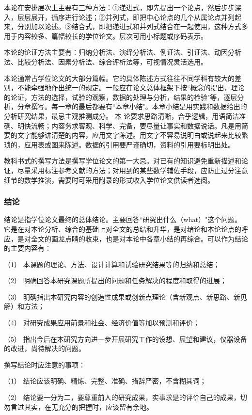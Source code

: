 本论在安排层次上主要有三种方法：①递进式，即先提出一个论点，然后步步深入，层层展开，循序进行论述；②并列式，即把中心论点的几个从属论点并列起来，分别加以论述。③结合式，即把递进式和并列式结合在一起使用，这种方式多用于内容较多、篇幅较长的学位论文。层次可用小标题或序码表示。

本论的论证方法主要有：归纳分析法、演绎分析法、例证法、引证法、动因分析法、比较分析法、因素分析法、综合评析法等，可视情况灵活选用。

本论通常占学位论文的大部分篇幅。它的具体陈述方式往往不同学科有较大的差别，不能牵强地作出统一的规定。一般应在论文总体框架下按``概念的提出，理论的论证，方法的选择，试验的观察，数据的处理与分析，结果的检验"等，逐层分析，分章撰写。每一章的最后都要有``本章小结"。本章小结是用实践和数据给出的分析研究结果，最忌主观推测成分。
本
论要求思路清晰，合乎逻辑，用语简洁准确、明快流畅；内容务求客观、科学、完备，要尽量让事实和数据说话。凡是用简要的文字能够讲清楚的内容，应用文字陈述。用文字不容易说明白或说起来比较繁琐的，应用表或图来陈述。数据的引用要严谨确切，资料的引用要标明出处。

教科书式的撰写方法是撰写学位论文的第一大忌。对已有的知识避免重新描述和论证，尽量采用标注参考文献的方法；对用到的某些数学辅佐手段，应防止过分注意细节的数学推演，需要时可采用附录的形式收入学位论文供读者选阅。

\subsubsection{结论}\label{appendixA-6-1-3}
结论是指学位论文最终的总体结论。主要回答``研究出什么（what）"这个问题。它是在对本论分析、综合的基础上对全文的总结和升华，是对绪论和本论论点的呼应，是对全文的画龙点睛的收束，也是对本论中各章小结的再综合。可以作为结论的主要内容有：

（1）	本课题的理论、方法、设计计算和试验研究结果等的归纳和总结；

（2）	明确回答本研究课题所提出的问题和任务解决的程度和取得的进展；

（3）	明确指出本研究内容的创造性成果或创新点理论（含新观点、新思路、新见解）和方法；

（4）	对研究成果应用前景和社会、经济价值等加以预测和评价；

（5）	指出今后在本研究方向进一步开展研究工作的设想、展望和建议，仪器设备的改进，尚待解决的问题。

撰写结论时应注意的事项：

（1）	结论应该明确、精炼、完整、准确、措辞严密，不含糊其词；

（2）	结论要一分为二，要尊重前人的研究成果，实事求是的评价自己的成果，切勿言过其实，在无充分的把握时，应该留有余地。


